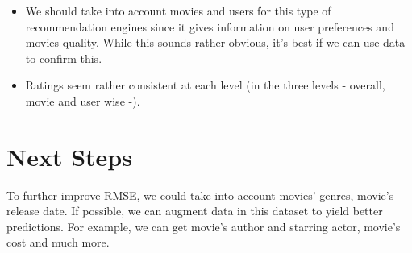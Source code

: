 \documentclass[]{article}
\providecommand{\tightlist}{%
  \setlength{\itemsep}{0pt}\setlength{\parskip}{0pt}}
\begin{document}
\begin{itemize}
\tightlist
\item
  We should take into account movies and users for this type of
  recommendation engines since it gives information on user preferences
  and movies quality. While this sounds rather obvious, it's best if we
  can use data to confirm this.
\item
  Ratings seem rather consistent at each level (in the three levels -
  overall, movie and user wise -).
\end{itemize}

\section{Next Steps}\label{next-steps}

To further improve RMSE, we could take into account movies' genres,
movie's release date. If possible, we can augment data in this dataset
to yield better predictions. For example, we can get movie's author and
starring actor, movie's cost and much more.
\end{document}
